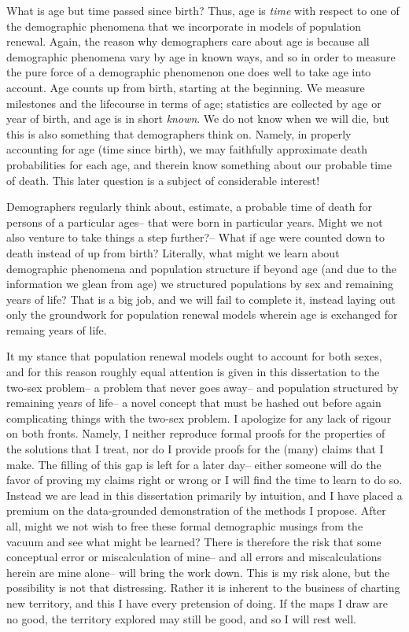What is age but time passed since birth? Thus, age is \textit{time} with respect
to one of the demographic phenomena that we incorporate in models of population
renewal. Again, the reason why demographers care about age is because all
demographic phenomena vary by age in known ways, and so in order to measure the
pure force of a demographic phenomenon one does well to take age into account.
Age counts up from birth, starting at the beginning. We measure milestones and
the lifecourse in terms of age; statistics are collected by age or year of
birth, and age is in short \textit{known}. We do not know when we will die, but
this is also something that demographers think on. Namely, in properly
accounting for age (time since birth), we may faithfully approximate death
probabilities for each age, and therein know something about our probable time
of death. This later question is a subject of considerable interest!

Demographers regularly think about, estimate, a probable time of
death for persons of a particular ages-- that were born in
particular years. Might we not also venture to take things a step further?--
What if age were counted down to death instead of up
from birth? Literally, what might we learn about demographic phenomena and
population structure if beyond age (and due to the information we glean from
age) we structured populations by sex and remaining years of life? That is a 
big job, and we will fail to complete it, instead laying out only the groundwork
for population renewal models wherein age is exchanged for remaing years of life.

It my stance that population renewal models ought to account for both sexes, and
for this reason roughly equal attention is given in this dissertation to the
two-sex problem-- a problem that never goes away-- and population structured
by remaining years of life-- a novel concept that must be hashed out before
again complicating things with the two-sex problem. I apologize for any lack of
rigour on both fronts. Namely, I neither reproduce formal proofs for the
properties of the solutions that I treat, nor do I provide proofs for the
(many) claims that I make. The filling of this gap is left for a later day--
either someone will do the favor of proving my claims right or wrong or I
will find the time to learn to do so. Instead we are lead in this dissertation
primarily by intuition, and I have placed a premium on the
data-grounded demonstration of the methods I propose. After all, might we not
wish to free these formal demographic musings from the vacuum and see what might
be learned? There is therefore the risk that some conceptual error or
miscalculation of mine-- and all errors and miscalculations herein are mine
alone-- will bring the work down. This is my risk alone, but the possibility is
not that distressing. Rather it is inherent to the business of charting new
territory, and this I have every pretension of doing. If the maps I draw are no
good, the territory explored may still be good, and so I will rest well.

